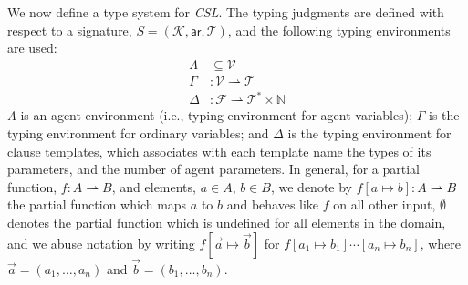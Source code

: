 \documentclass[orivec,final]{llncs-href}
\newcommand{\nat}{\mathbb{N}}
\newcommand{\actionkindset}{\mathcal{K}}
\newcommand{\typeset}{\mathcal{T}}
\newcommand{\templatenameset}{\mathcal{F}}
\newcommand{\tp}{\mathsf{ar}}
\newcommand{\csl}{\textit{CSL}}
\newcommand{\varset}{\mathcal{V}}
\begin{document}
We now define a type system for \csl{}. The typing judgments are
defined with respect to  a signature, $S =
(\actionkindset,\tp,\typeset)$, and the following typing environments
are used:
\begin{align}
\Lambda &\subseteq \varset \tag{Agent typing environment}\\
\Gamma &: \varset \rightharpoonup \typeset \tag{Variable typing environment}\\
\Delta &: \templatenameset \rightharpoonup \typeset^* \times \nat
\tag{Template typing environment}
\end{align}
$\Lambda$ is an agent environment (i.e., typing environment for agent
variables); $\Gamma$ is the typing environment for ordinary variables;
and $\Delta$ is the typing environment for clause templates, which
associates with each template name the types of its parameters, and
the number of agent parameters. In general, for a partial function, $f
: A \rightharpoonup B$, and elements, $a \in A$, $b \in B$, we denote
by $f[a \mapsto b] : A \rightharpoonup B$ the partial function which
maps $a$ to $b$ and behaves like $f$ on all other input, $\emptyset$
denotes the partial function which is undefined for all elements in
the domain, and we abuse notation by writing $f[\vec{a} \mapsto
\vec{b}]$ for $f[a_1 \mapsto b_1]\cdots[a_n \mapsto b_n]$, where
$\vec{a} = (a_1,\ldots,a_n)$ and $\vec{b} = (b_1,\ldots,b_n)$.
\end{document}

